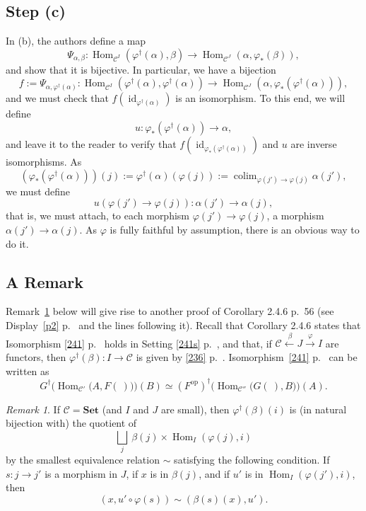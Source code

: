 \documentclass[12pt]{article}
\theoremstyle{remark}
\newtheorem{rk}[thm]{Remark}
\theoremstyle{definition}
\newcommand{\C}{\mathcal C}
\newcommand{\Set}{\mathbf{Set}}
\DeclareMathOperator*{\coli}{colim}
\DeclareMathOperator{\id}{id}
\DeclareMathOperator{\Hom}{Hom}%
\DeclareMathOperator{\op}{op}
\begin{document}
\subsection{Step (c)} %
%
In (b), the authors define a map 
%
\begin{equation}\label{e233i} 
%
\Psi_{\alpha,\beta}:
\Hom_{\C^I}(\varphi^\dagger(\alpha),\beta)\to
\Hom_{\C^J}(\alpha,\varphi_*(\beta)),
%
\end{equation} 
%
and show that it is bijective. In particular, we have a bijection 
$$
f:=\Psi_{\alpha,\varphi^\dagger(\alpha)}:
\Hom_{\C^I}(\varphi^\dagger(\alpha),\varphi^\dagger(\alpha))\to
\Hom_{\C^J}(\alpha,\varphi_*(\varphi^\dagger(\alpha))),
$$
and we must check that $f(\id_{\varphi^\dagger(\alpha)})$ is an isomorphism. To this end, we will define 
$$
u:\varphi_*(\varphi^\dagger(\alpha))\to\alpha,
$$
and leave it to the reader to verify that $f(\id_{\varphi_*(\varphi^\dagger(\alpha))})$ and $u$ are inverse isomorphisms. As 
$$ 
(\varphi_*(\varphi^\dagger(\alpha)))(j):=\varphi^\dagger(\alpha)(\varphi(j)):=\coli_{\varphi(j')\to\varphi(j)}\alpha(j'),
$$
we must define 
$$
u(\varphi(j')\to\varphi(j)):\alpha(j')\to\alpha(j),
$$
that is, we must attach, to each morphism $\varphi(j')\to\varphi(j)$, a morphism $\alpha(j')\to\alpha(j)$. As $\varphi$ is fully faithful by assumption, there is an obvious way to do it. 
%
\subsection{A Remark}\label{s236} %
%
Remark~\ref{r236} below will give rise to another proof of Corollary 2.4.6 p.~56 (see Display~\eqref{p2} p.~\pageref{p2} and the lines following it). Recall that Corollary 2.4.6 states that Isomorphism \eqref{241} p.~\pageref{241} holds in Setting \eqref{241s} p.~\pageref{241s}, and that, if $\C\xleftarrow{\,\beta}J\xrightarrow{\varphi}I$ are functors, then $\varphi^\dagger(\beta):I\to\C$ is given by \eqref{236} p.~\pageref{236}. Isomorphism~\eqref{241} p.~\pageref{241} can be written as 
$$
G^\dagger\Big(\Hom_{\C'}\big(A,F(\ )\big)\Big)(B)\simeq
(F^{\op})^\dagger\Big(\Hom_{\C''}\big(G(\ ),B\big)\Big)(A).
$$ 
%
\begin{rk}\label{r236}
If $\C=\Set$ (and $I$ and $J$ are small), then $\varphi^\dagger(\beta)(i)$ is (in natural bijection with) the quotient of 
$$
\bigsqcup_j\ \beta(j)\times\Hom_I(\varphi(j),i) 
$$ 
by the smallest equivalence relation $\sim$ satisfying the following condition. If $s:j\to j'$ is a morphism in $J$, if $x$ is in $\beta(j)$, and if $u'$ is in $\Hom_I(\varphi(j'),i)$, then 
$$
(x,u'\circ\varphi(s))\sim(\beta(s)(x),u'). 
$$ 
\end{rk} 
%
\end{document}
